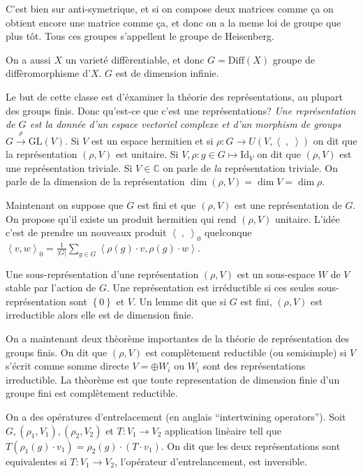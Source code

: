 \documentclass[10pt]{report}
\newcommand{\abs}[1]{\left|#1\right|}
\newcommand{\expvalue}[1]{\left<#1\right>}
\begin{document}
C'est bien sur anti-symetrique, et si on compose deux matrices comme \c{c}a on obtient encore une matrice comme \c{c}a, et donc on a la meme loi de groupe que plus t\^ot. Tous ces groupes s'appellent le groupe de Heisenberg.

On a aussi $X$ un variet\'e diff\`erentiable, et donc $G = \mathrm{Diff}(X)$ groupe de diff\`eromorphisme d'$X$. $G$ est de dimension infinie.

Le but de cette classe est d'\'examiner la th\'eorie des repr\'esentations, au plupart des groups finis. Donc qu'est-ce que c'est une repr\'esentations? \emph{Une repr\'esentation de $G$ est la donn\'ee d'un espace vectoriel complexe et d'un morphism de groups $G \overset{\rho}{\to} \mathrm{GL}(V)$}. Si $V$ est un espace hermitien et si $\rho: G \to U(V, \expvalue{\;,\;})$ on dit que la repr\'esentation $(\rho,V)$ est unitaire. Si $V, \rho: g \in G \mapsto \mathrm{Id}_V$ on dit que $(\rho,V)$ est une repr\'esentation triviale. Si $V \in \mathbb{C}$ on parle de \emph{la} repr\'esentation triviale. On parle de la dimension de la repr\'esentation $\dim(\rho,V) = \dim V = \dim \rho$. 

Maintenant on suppose que $G$ est fini et que $(\rho,V)$ est une repr\'esentation de $G$. On propose qu'il existe un produit hermitien qui rend $(\rho,V)$ unitaire. L'id\'ee c'est de prendre un nouveaux produit $\expvalue{\;,\;}_0$ quelconque $\expvalue{v,w}_0 = \frac{1}{\abs{G}}\sum\limits_{g\in G}^{}\expvalue{\rho(g)\cdot v, \rho(g) \cdot w}$. 

Une sous-repr\'esentation d'une repr\'esentation $(\rho,V)$ est un sous-espace $W$ de $V$ stable par l'action de $G$. Une repr\'esentation est irr\'eductible si ces seules sous-repr\'esentation sont $\left\{ 0 \right\}$ et $V$. Un lemme dit que si $G$ est fini, $(\rho,V)$ est irreductible alors elle est de dimension finie.

On a maintenant deux th\`eor\`eme importantes de la th\'eorie de repr\'esentation des groups finis. On dit que $(\rho,V)$ est compl\`etement reductible (ou semisimple) si $V$ s'\'ecrit comme somme directe $V = \oplus W_i$ ou $W_i$ sont des repr\'esentations irreductible. La th\`eor\`eme est que toute representation de dimension finie d'un groupe fini est compl\`etement reductible.

On a des op\'eratures  d'entrelacement (en anglais ``intertwining operators''). Soit $G, (\rho_1, V_1), (\rho_2,V_2)$ et $T: V_1 \to V_2$ application lin\`eaire tell que $T\left( \rho_1(g) \cdot v_1 \right) = \rho_2(g) \cdot \left( T \cdot v_1 \right)$. On dit que les deux repr\'esentations sont equivalentes si $T:V_1 \to V_2$, l'op\'erateur d'entrelancement, est inversible.
\end{document}
